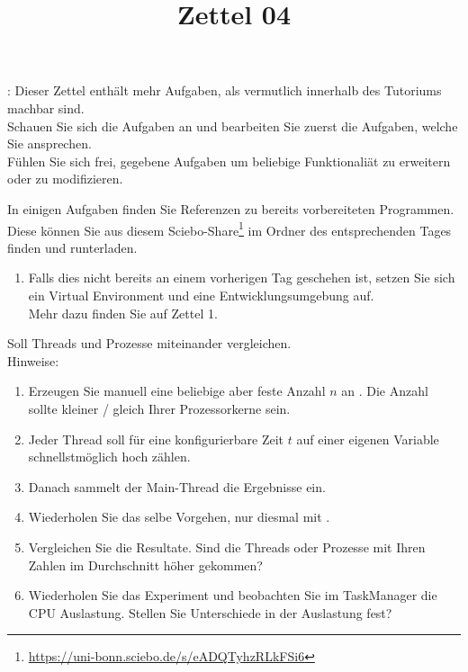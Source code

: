 \documentclass{ubo_tex_uebungszettel/uebungszettel}
\title{Zettel 04}
\theoremstyle{definition}
\newcommand{\furl}[1]{\footnote{\url{#1}}}
\begin{document}
\maketitle

\noindent {}: \quad
Dieser Zettel enthält mehr Aufgaben, als vermutlich innerhalb des Tutoriums machbar sind.\\
Schauen Sie sich die Aufgaben an und bearbeiten Sie zuerst die Aufgaben, welche Sie ansprechen.\\
Fühlen Sie sich frei, gegebene Aufgaben um beliebige Funktionaliät zu erweitern oder zu modifizieren.

\medskip

\noindent In einigen Aufgaben finden Sie Referenzen zu bereits vorbereiteten Programmen. Diese können Sie aus diesem Sciebo-Share\furl{https://uni-bonn.sciebo.de/s/eADQTyhzRLkFSi6} im Ordner des entsprechenden Tages finden und runterladen.

\medskip


\noindent {} \quad

    \begin{enumerate}
        \item Falls dies nicht bereits an einem vorherigen Tag geschehen ist, setzen Sie sich ein Virtual Environment und eine Entwicklungsumgebung auf.\\
        Mehr dazu finden Sie auf Zettel 1.

    \end{enumerate}

\medskip
\medskip

	\noindent {} \quad

\noindent Soll Threads und Prozesse miteinander vergleichen.\\

Hinweise:
\begin{enumerate}
	\item Erzeugen Sie manuell eine beliebige aber feste Anzahl $n$ an . Die Anzahl sollte kleiner / gleich Ihrer Prozessorkerne sein.
	
	\item Jeder Thread soll für eine konfigurierbare Zeit $t$ auf einer eigenen Variable schnellstmöglich hoch zählen.
	
	\item Danach sammelt der Main-Thread die Ergebnisse ein.
	
	\item Wiederholen Sie das selbe Vorgehen, nur diesmal mit .
	
	\item Vergleichen Sie die Resultate. Sind die Threads oder Prozesse mit Ihren Zahlen im Durchschnitt höher gekommen?
	
	\item Wiederholen Sie das Experiment und beobachten Sie im TaskManager die CPU Auslastung. Stellen Sie Unterschiede in der Auslastung fest?
	
\end{enumerate}
\end{document}
